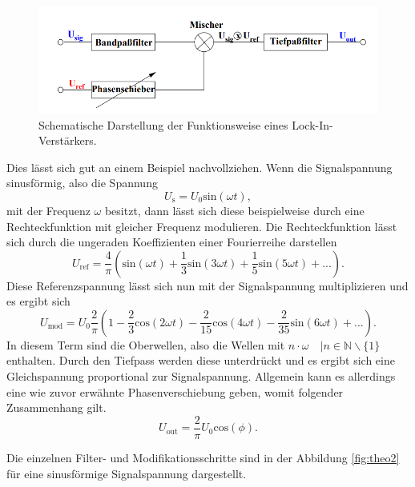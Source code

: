 \begin{figure}
    \centering
    \includegraphics[width=\textwidth]{bilder/theo1.png}
    \caption{Schematische Darstellung der Funktionsweise eines Lock-In-Verstärkers.} 
    \label{fig:theo1}
\end{figure}
Dies lässt sich gut an einem Beispiel nachvollziehen. Wenn die Signalspannung sinusförmig, also die Spannung
\begin{equation*}
    U_{\text{s}} = U_0 \text{sin}(\omega t),
\end{equation*}
mit der Frequenz $\omega$ besitzt, dann lässt sich diese beispielweise durch eine Rechteckfunktion mit gleicher Frequenz modulieren. Die Rechteckfunktion lässt sich durch
die ungeraden Koeffizienten einer Fourierreihe darstellen
\begin{equation*}
    U_{\text{ref}} = \frac{4}{\pi}\left( \text{sin}(\omega t) + \frac{1}{3}  \text{sin}(3\omega t) + \frac{1}{5}  \text{sin}(5\omega t) + ...\right).
\end{equation*}
Diese Referenzspannung lässt sich nun mit der Signalspannung multiplizieren und es ergibt sich
\begin{equation*}
    U_{\text{mod}} = U_0 \frac{2}{\pi}\left(1- \frac{2}{3} \text{cos}(2\omega t) - \frac{2}{15}  \text{cos}(4\omega t) - \frac{2}{35}  \text{sin}(6\omega t) + ...\right).
\end{equation*}
In diesem Term sind die Oberwellen, also die Wellen mit $n \cdot \omega \quad | n \in \mathbb{N}\backslash\{1\}$ enthalten. Durch den Tiefpass werden diese unterdrückt und es ergibt 
sich eine Gleichspannung proportional zur Signalspannung. Allgemein kann es allerdings eine wie zuvor erwähnte Phasenverschiebung geben, womit folgender Zusammenhang gilt.
\begin{equation}
    U_{\text{out}} =\frac{2}{\pi}U_{0} \text{cos}(\phi).
\end{equation}

Die einzelnen Filter- und Modifikationsschritte sind in der Abbildung \ref{fig:theo2} für eine sinusförmige Signalspannung dargestellt.

